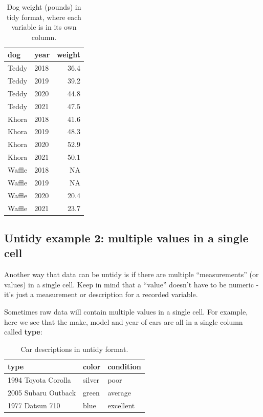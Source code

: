 \documentclass[
]{book}
\begin{document}
\begin{table}

\caption{\label{tab:unnamed-chunk-8}Dog weight (pounds) in tidy format, where each variable is in its own column.}
\centering
\begin{tabular}[t]{l|l|r}
\hline
dog & year & weight\\
\hline
Teddy & 2018 & 36.4\\
\hline
Teddy & 2019 & 39.2\\
\hline
Teddy & 2020 & 44.8\\
\hline
Teddy & 2021 & 47.5\\
\hline
Khora & 2018 & 41.6\\
\hline
Khora & 2019 & 48.3\\
\hline
Khora & 2020 & 52.9\\
\hline
Khora & 2021 & 50.1\\
\hline
Waffle & 2018 & NA\\
\hline
Waffle & 2019 & NA\\
\hline
Waffle & 2020 & 20.4\\
\hline
Waffle & 2021 & 23.7\\
\hline
\end{tabular}
\end{table}

\hypertarget{untidy-example-2-multiple-values-in-a-single-cell}{%
\subsection{Untidy example 2: multiple values in a single cell}\label{untidy-example-2-multiple-values-in-a-single-cell}}

Another way that data can be untidy is if there are multiple ``measurements'' (or values) in a single cell. Keep in mind that a ``value'' doesn't have to be numeric - it's just a measurement or description for a recorded variable.

Sometimes raw data will contain multiple values in a single cell. For example, here we see that the make, model and year of cars are all in a single column called \textbf{type}:

\begin{table}

\caption{\label{tab:unnamed-chunk-9}Car descriptions in untidy format.}
\centering
\begin{tabular}[t]{l|l|l}
\hline
type & color & condition\\
\hline
1994 Toyota Corolla & silver & poor\\
\hline
2005 Subaru Outback & green & average\\
\hline
1977 Datsun 710 & blue & excellent\\
\hline
\end{tabular}
\end{table}
\end{document}
